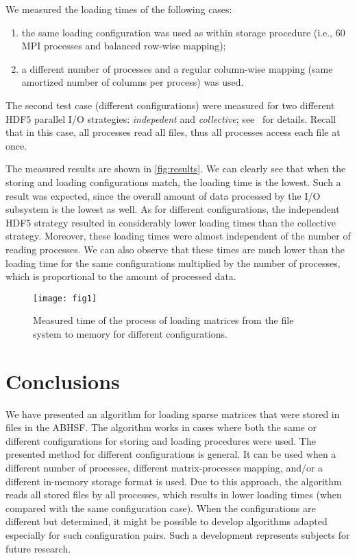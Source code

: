 \documentclass[10pt,a4paper]{article}
\begin{document}
We measured the loading times of the following cases:
\begin{enumerate}
\item the same loading configuration was used as within storage procedure (i.e., 60 MPI processes and balanced row-wise mapping);
\item a different number of processes and a regular column-wise mapping (same amortized number of columns per process) was used.
\end{enumerate}
The second test case (different configurations) were measured for two different HDF5 parallel I/O strategies: \emph{indepedent} and \emph{collective}; see~\cite{HDFGroup:2013} for details. Recall that in this case, all processes read all files, thus all processes access each file at once.

The measured results are shown in \autoref{fig:results}. We can clearly see that when the storing and loading configurations match, the loading time is the lowest. Such a result was expected, since the overall amount of data processed by the I/O subsystem is the lowest as well. As for different configurations, the independent HDF5 strategy resulted in considerably lower loading times than the collective strategy. Moreover, these loading times were almost independent of the number of reading processes. We can also observe that these times are much lower than the loading time for the same configurations multiplied by the number of processes, which is proportional to the amount of processed data.

\begin{figure}[t]
\centering
\texttt{[image: fig1]}
\caption{Measured time of the process of loading matrices from the file system to memory for different configurations.}
\label{fig:results}
\end{figure}

\section{Conclusions}

We have presented an algorithm for loading sparse matrices that were stored in files in the ABHSF. The algorithm works in cases where both the same or different configurations for storing and loading procedures were used. The presented method for different configurations is general. It can be used when a different number of processes, different matrix-processes mapping, and/or a different in-memory storage format is used. Due to this approach, the algorithm reads all stored files by all processes, which results in lower loading times (when compared with the same configuration case). When the configurations are different but determined, it might be possible to develop algorithms adapted especially for such configuration pairs. Such a development represents subjects for future research.
\end{document}
